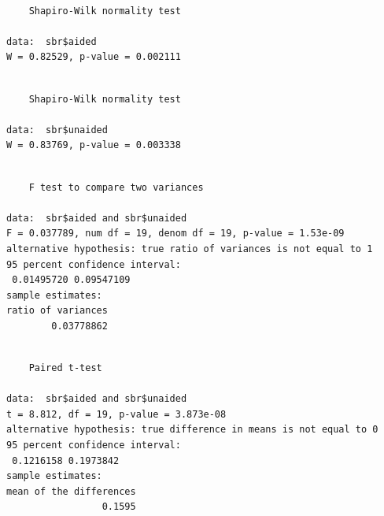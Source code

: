 \documentclass[
  letterpaper,
]{book}
\newenvironment{Shaded}{\begin{snugshade}}{\end{snugshade}}
\newcommand{\AttributeTok}[1]{\textcolor[rgb]{0.40,0.45,0.13}{#1}}
\newcommand{\CommentTok}[1]{\textcolor[rgb]{0.37,0.37,0.37}{#1}}
\newcommand{\ConstantTok}[1]{\textcolor[rgb]{0.56,0.35,0.01}{#1}}
\newcommand{\FunctionTok}[1]{\textcolor[rgb]{0.28,0.35,0.67}{#1}}
\newcommand{\NormalTok}[1]{\textcolor[rgb]{0.00,0.23,0.31}{#1}}
\newcommand{\SpecialCharTok}[1]{\textcolor[rgb]{0.37,0.37,0.37}{#1}}
\begin{document}
\begin{verbatim}

    Shapiro-Wilk normality test

data:  sbr$aided
W = 0.82529, p-value = 0.002111
\end{verbatim}

\begin{Shaded}
\end{Shaded}

\begin{verbatim}

    Shapiro-Wilk normality test

data:  sbr$unaided
W = 0.83769, p-value = 0.003338
\end{verbatim}

\begin{Shaded}
\end{Shaded}

\begin{verbatim}

    F test to compare two variances

data:  sbr$aided and sbr$unaided
F = 0.037789, num df = 19, denom df = 19, p-value = 1.53e-09
alternative hypothesis: true ratio of variances is not equal to 1
95 percent confidence interval:
 0.01495720 0.09547109
sample estimates:
ratio of variances 
        0.03778862 
\end{verbatim}

\begin{Shaded}
\end{Shaded}

\begin{verbatim}

    Paired t-test

data:  sbr$aided and sbr$unaided
t = 8.812, df = 19, p-value = 3.873e-08
alternative hypothesis: true difference in means is not equal to 0
95 percent confidence interval:
 0.1216158 0.1973842
sample estimates:
mean of the differences 
                 0.1595 
\end{verbatim}
\end{document}
